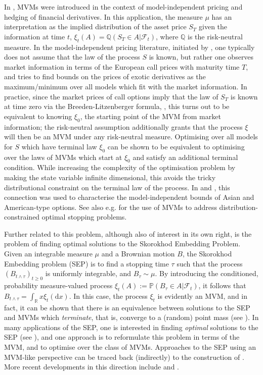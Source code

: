 \documentclass{article}
\theoremstyle{definition}
\numberwithin{equation}{section}
\numberwithin{theorem}{section}
\renewcommand{\P}{\mathbb{P}}
\newcommand{\Q}{\mathbb{Q}}
\newcommand{\R}{\mathbb{R}}
\newcommand{\dx}{\mathrm{d}x}
\newcommand{\Fc}{\mathcal{F}}
\renewcommand{\Pr}{\P}
\renewcommand{\P}{{\mathbb P}}
\begin{document}
In \cite{cox2017}, MVMs were introduced in the context of model-independent pricing and hedging of financial derivatives. In this application, the measure $\mu$ has an interpretation as the implied distribution of the asset price $S_T$ given the information at time $t$, $\xi_t(A) = \Q(S_T \in A|\Fc_t)$, where $\Q$ is the risk-neutral measure. In the model-independent pricing literature, initiated by \cite{hobson1998}, one typically does not assume that the law of the process $S$ is known, but rather one observes market information in terms of the European call prices with maturity time $T$, and tries to find bounds on the prices of exotic derivatives as the maximum/minimum over all models which fit with the market information. In practice, since the market prices of call options imply that the law of $S_T$ is known at time zero via the Breeden-Litzenberger formula, \citep{breeden_prices_1978}, this turns out to be equivalent to knowing $\xi_0$, the starting point of the MVM from market information; the risk-neutral assumption additionally grants that the process $\xi$ will then be an MVM under any risk-neutral measure. Optimising over all models for $S$ which have terminal law $\xi_0$ can be shown to be equivalent to optimising over the laws of MVMs which start at $\xi_0$ and satisfy an additional terminal condition. While increasing the complexity of the optimisation problem by making the state variable infinite dimensional, this avoids the tricky distributional constraint on the terminal law of the process. In \cite{cox2017} and \cite{bayraktar_martingale_2018}, this connection was used to characterise the model-independent bounds of Asian and American-type options.
See also e.g. \cite{kallblad2017dynamic} for the use of MVMs to address distribution-constrained optimal stopping problems. 

Further related to this problem, although also of interest in its own
right, is the problem of finding optimal solutions to the Skorokhod
Embedding Problem. Given an integrable measure $\mu$ and a Brownian
motion $B$, the Skorokhod Embedding problem (SEP) is to find a
stopping time $\tau$ such that the process
$(B_{t \wedge \tau})_{t \ge 0}$ is uniformly integrable, and
$B_\tau \sim \mu$. By introducing the conditioned, probability
measure-valued process $\xi_t(A) := \Pr(B_{\tau} \in A|\Fc_t)$, it
follows that $B_{t \wedge \tau} = \int_{\R} x \xi_t(\dx)$. In this case,
the process $\xi_t$ is evidently an MVM, and in fact,
it can be shown that there is an equivalence between solutions to the
SEP and MVMs which \emph{terminate}, that is, converge to a (random)
point mass (see \cite{cox2017}). In many applications of the SEP, one is interested in finding
\emph{optimal} solutions to the SEP (see
\cite{obloj2004,beiglboeck2017}), and one approach is to
reformulate this problem in terms of the MVM, and to optimise over the
class of MVMs. Approaches to the SEP using an MVM-like perspective can
be traced back (indirectly) to the construction of
\cite{bass_skorokhod_1983}. More recent developments in this direction
include \cite{eldan2016} and \cite{beiglboeck2017mvm}.
\end{document}
